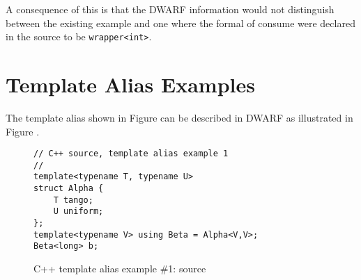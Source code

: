 A consequence of this is that the DWARF information would
not distinguish between the existing example and one where
the formal of consume were declared in the source to be
\texttt{wrapper\textless int\textgreater}.


\section{Template Alias Examples}
\label{app:templatealiasexample}

The  template alias shown in
Figure 
can be described in DWARF as illustrated 
 in 
Figure .

\begin{figure}[h]
\begin{lstlisting}
// C++ source, template alias example 1
//
template<typename T, typename U>
struct Alpha {
    T tango;
    U uniform;
};
template<typename V> using Beta = Alpha<V,V>;
Beta<long> b;
\end{lstlisting}
\caption{C++ template alias example \#1: source}
\label{fig:ctemplatealiasexample1source}
\end{figure}

